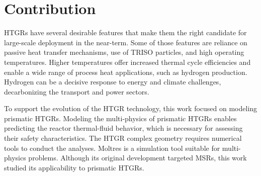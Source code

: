 \section{Contribution}

HTGRs have several desirable features that make them the right candidate for large-scale deployment in the near-term.
Some of those features are reliance on passive heat transfer mechanisms, use of TRISO particles, and high operating temperatures.
Higher temperatures offer increased thermal cycle efficiencies and enable a wide range of process heat applications, such as hydrogen production.
Hydrogen can be a decisive response to energy and climate challenges, decarbonizing the transport and power sectors.

To support the evolution of the HTGR technology, this work focused on modeling prismatic HTGRs.
Modeling the multi-physics of prismatic HTGRs enables predicting the reactor thermal-fluid behavior, which is necessary for assessing their safety characteristics.
The HTGR complex geometry requires numerical tools to conduct the analyses.
Moltres is a simulation tool suitable for multi-physics problems.
Although its original development targeted MSRs, this work studied its applicability to prismatic HTGRs.

